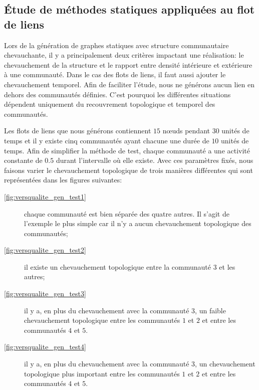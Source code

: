 %



\subsection{Étude de méthodes statiques appliquées au flot de liens}
\label{sec:versqualite_statique}

Lors de la génération de graphes statiques avec structure communautaire chevauchante, il y a principalement deux critères impactant une réalisation: le chevauchement de la structure et le rapport entre densité intérieure et extérieure à une communauté.
Dans le cas des flots de liens, il faut aussi ajouter le chevauchement temporel.
Afin de faciliter l'étude, nous ne générons aucun lien en dehors des communautés définies.
C'est pourquoi les différentes situations dépendent uniquement du recouvrement topologique et temporel des communautés.
 
Les flots de liens que nous générons contiennent $15$ n\oe uds pendant $30$ unités de temps et il y existe cinq communautés ayant chacune une durée de $10$ unités de temps.
Afin de simplifier la méthode de test, chaque communauté a une activité constante de $0.5$ durant l'intervalle où elle existe.
Avec ces paramètres fixés, nous faisons varier le chevauchement topologique de trois manières différentes qui sont représentées dans les figures suivantes:

\begin{description}
\item[\ref{fig:versqualite_gen_test1}] chaque communauté est bien séparée des quatre autres. Il s'agit de l'exemple le plus simple car il n'y a aucun chevauchement topologique des communautés;
\item[\ref{fig:versqualite_gen_test2}] il existe un chevauchement topologique entre la communauté $3$ et les autres;
\item[\ref{fig:versqualite_gen_test3}] il y a, en plus du chevauchement avec la communauté $3$, un faible chevauchement topologique entre les communautés $1$ et $2$ et entre les communautés $4$ et $5$.
\item[\ref{fig:versqualite_gen_test4}] il y a, en plus du chevauchement avec la communauté $3$, un chevauchement topologique plus important entre les communautés $1$ et $2$ et entre les communautés $4$ et $5$.
\end{description}


